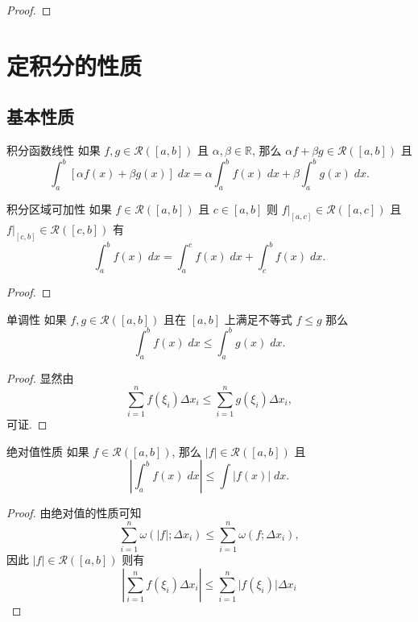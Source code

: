 \documentclass[cn,toc=twocol]{elegantbook}
\newcommand{\R}{\mathbb{R}}
\begin{document}
\begin{proof}
\end{proof}

\section{定积分的性质}

\subsection{基本性质}

\begin{theorem}{积分函数线性}
	如果 $f,g \in \mathscr{R}([a,b])$ 且 $\alpha,\beta \in \R$, 那么 $\alpha f + \beta g \in \mathscr{R}([a,b])$ 且
	\[
		\int_a^b [\alpha f(x) + \beta g(x)]\;dx= \alpha \int_a^b f(x)\;dx + \beta \int_a^b g(x)\;dx.
	\]
\end{theorem}

\begin{theorem}{积分区域可加性}
	如果 $f\in\mathscr{R}([a,b])$ 且 $c \in [a,b]$ 则 $f|_{[a,c]} \in \mathscr{R}([a,c])$ 且  $f|_{[c,b]} \in \mathscr{R}([c,b])$ 有
	\[
		\int_a^b f(x)\;dx = \int_a^c f(x)\;dx + \int_c^b f(x)\;dx.
	\]
\end{theorem}
\begin{proof}
\end{proof}

\begin{theorem}{单调性}
	如果 $f,g \in \mathscr{R}([a,b])$ 且在 $[a,b]$ 上满足不等式 $f \le g$ 那么
	\[
		\int_a^b f(x)\;dx \le \int_a^b g(x)\;dx.
	\]
\end{theorem}
\begin{proof}
	显然由
	\[
		\sum_{i=1}^n f(\xi_i) \Delta x_i \le \sum_{i=1}^n g(\xi_i) \Delta x_i,
	\]
	可证.
\end{proof}


\begin{theorem}{绝对值性质}
	如果 $f \in \mathscr{R}([a,b])$, 那么 $\lvert f \rvert \in \mathscr{R}([a,b])$ 且
	\[
		\left\lvert \int_a^b f(x)\;dx \right\rvert \le \int \lvert f(x) \rvert\;dx.
	\]
\end{theorem}
\begin{proof}
	由绝对值的性质可知
	\[
		\sum_{i = 1}^n \omega(\lvert f \rvert; \Delta x_i) \le \sum_{i = 1}^n \omega(f; \Delta x_i),
	\]
	因此 $\lvert f \rvert \in \mathscr{R}([a,b])$ 则有
	\[
		\left\lvert \sum_{i=1}^n f(\xi_i) \Delta x_i \right\rvert \le \sum_{i=1}^n \lvert f(\xi_i) \rvert \Delta x_i
	\] 
\end{proof}
\end{document}

